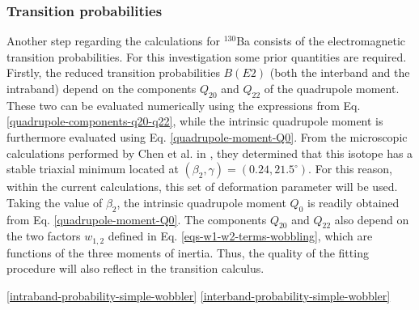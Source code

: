 \subsubsection*{Transition probabilities}

Another step regarding the calculations for $^{130}$Ba consists of the electromagnetic transition probabilities. For this investigation some prior quantities are required. Firstly, the reduced transition probabilities $B(E2)$ (both the interband and the intraband) depend on the components $Q_{20}$ and $Q_{22}$ of the quadrupole moment. These two can be evaluated numerically using the expressions from Eq. \ref{quadrupole-components-q20-q22}, while the intrinsic quadrupole moment is furthermore evaluated using Eq. \ref{quadrupole-moment-Q0}. From the microscopic calculations performed by Chen et al. in \cite{chen2019transverse}, they determined that this isotope has a stable triaxial minimum located at $(\beta_2,\gamma)=(0.24,21.5^\circ)$. For this reason, within the current calculations, this set of deformation parameter will be used. Taking the value of $\beta_2$, the intrinsic quadrupole moment $Q_0$ is readily obtained from Eq. \ref{quadrupole-moment-Q0}. The components $Q_{20}$ and $Q_{22}$ also depend on the two factors $w_{1,2}$ defined in Eq. \ref{eqs-w1-w2-terms-wobbling}, which are functions of the three moments of inertia. Thus, the quality of the fitting procedure will also reflect in the transition calculus.



\ref{intraband-probability-simple-wobbler}
\ref{interband-probability-simple-wobbler}


